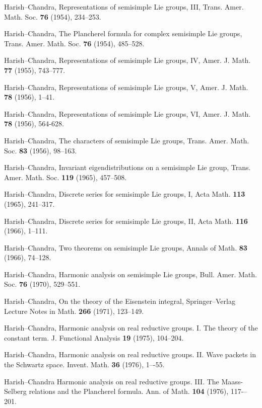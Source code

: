 \documentclass{conm-p-l}
\begin{document}
\begin{thebibliography}{XX}
Harish--Chandra,
Representations of semisimple Lie groups, III,
Trans. Amer. Math. Soc. {\bf 76} (1954), 234--253.

Harish--Chandra,
The Plancherel formula for complex semisimple Lie groups,
Trans. Amer. Math. Soc. {\bf 76} (1954), 485--528.

Harish--Chandra,
Representations of semisimple Lie groups, IV,
Amer. J. Math. {\bf 77} (1955), 743--777.

Harish--Chandra,
Representations of semisimple Lie groups, V,
Amer. J. Math. {\bf 78} (1956), 1--41.

Harish--Chandra,
Representations of semisimple Lie groups, VI,
Amer. J. Math. {\bf 78} (1956), 564-628.

Harish--Chandra,
The characters of semisimple Lie groups,
Trans. Amer. Math. Soc. {\bf 83} (1956), 98--163.

Harish--Chandra,
Invariant eigendistributions on a semisimple Lie group,
Trans. Amer. Math. Soc. {\bf 119} (1965), 457--508.

Harish--Chandra,
Discrete series for semisimple Lie groups, I,
Acta Math. {\bf 113} (1965), 241--317.

Harish--Chandra,
Discrete series for semisimple Lie groups, II,
Acta Math. {\bf 116} (1966), 1--111.

Harish--Chandra,
Two theorems on semisimple Lie groups,
Annals of Math. {\bf 83} (1966), 74--128.

Harish--Chandra,
Harmonic analysis on semisimple Lie groups,
Bull. Amer. Math. Soc. {\bf76} (1970), 529--551.

Harish--Chandra,
On the theory of the Eisenstein integral, Springer--Verlag
Lecture Notes in Math. {\bf 266} (1971), 123--149.

Harish--Chandra,
Harmonic analysis on real reductive groups. I. The theory of the constant
term. J. Functional Analysis {\bf 19} (1975), 104--204.

Harish--Chandra,
Harmonic analysis on real reductive groups. II. Wave packets in the Schwartz
space. Invent. Math. {\bf 36} (1976), 1–-55.

Harish--Chandra Harmonic analysis on real reductive groups. III. The
Maass-Selberg relations and the Plancherel formula.
Ann. of Math. {\bf 104} (1976), 117-–201.


\end{thebibliography}
\end{document}
